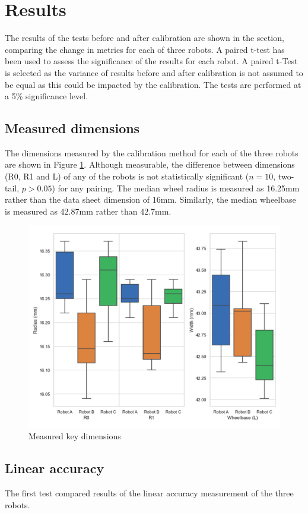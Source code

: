 \documentclass[conference]{IEEEtran}
\begin{document}
\section{Results}\label{sec:results}


The results of the tests before and after calibration are shown in the section, comparing the change in metrics for each of three robots. 
A paired t-test has been used to assess the significance of the results for each robot. A paired t-Test is selected as the variance of results before and after calibration is not assumed to be equal as this could be impacted by the calibration. The tests are performed at a 5\% significance level.

\subsection{Measured dimensions}

The dimensions measured by the calibration method for each of the three robots are shown in Figure \ref{fig:r0r1L}. 
Although measurable, the difference between dimensions (R0, R1 and L) of any of the robots is not statistically significant ($n = 10$, two-tail, $p > 0.05 $) for any pairing. 
The median wheel radius is measured as 16.25mm rather than the data sheet dimension of 16mm. 
Similarly, the median wheelbase is measured as 42.87mm rather than 42.7mm.

\begin{figure}[h]
    \centering
    \includegraphics[width=.5\textwidth]{img/r0r1l.png}
    \caption{Measured key dimensions}
    \label{fig:r0r1L}
\end{figure}

\subsection{Linear accuracy}

The first test compared results of the linear accuracy measurement of the three robots. 
\end{document}
